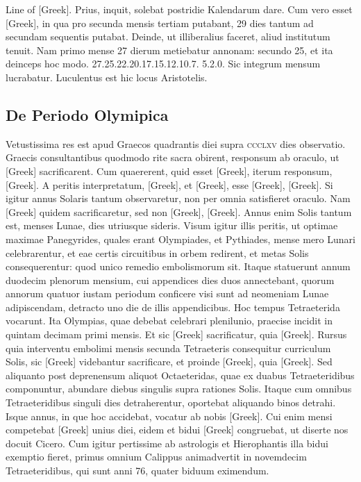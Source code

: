 \textgreek{Line of [Greek]}.
Prius, inquit, solebat postridie Kalendarum dare.
Cum vero esset
\textgreek{[Greek]}, in qua pro secunda mensis tertiam putabant,
 29 dies tantum
ad secundam sequentis putabat.
Deinde, ut illiberalius faceret, aliud
institutum tenuit.
Nam primo mense 27 dierum metiebatur annonam:
secundo 25, et ita deinceps hoc modo. 27.25.22.20.17.15.12.10.7.
5.2.0.
Sic integrum mensum lucrabatur.
Luculentus est hic locus
Aristotelis.

\subsection{De Periodo Olymipica}
Vetustissima res est apud Graecos quadrantis diei supra
\textsc{ccclxv} dies observatio.
Graecis consultantibus quodmodo
rite sacra obirent, responsum ab oraculo, ut \textgreek{[Greek]} sacrificarent.
Cum quaererent, quid esset \textgreek{[Greek]}, iterum responsum,
\textgreek{[Greek]}.
A peritis interpretatum, \textgreek{[Greek]}, et \textgreek{[Greek]},
esse \textgreek{[Greek]}, \textgreek{[Greek]}.
Si igitur annus Solaris tantum
observaretur, non per omnia satisfieret oraculo.
Nam \textgreek{[Greek]}
quidem sacrificaretur, sed non \textgreek{[Greek]}, \textgreek{[Greek]}.
Annus enim
Solis tantum est, menses Lunae, dies utriusque sideris.
Visum igitur
illis peritis, ut optimae maximae Panegyrides, quales erant Olympiades,
et Pythiades, mense mero Lunari celebrarentur, et eae certis circuitibus
in orbem redirent, et metas Solis consequerentur: quod unico
remedio embolismorum sit.
Itaque statuerunt annum duodecim plenorum
mensium, cui appendices dies duos annectebant, quorum annorum
quatuor iustam periodum conficere visi sunt ad neomeniam
Lunae adipiscendam, detracto uno die de illis appendicibus.
Hoc tempus
Tetraeterida vocarunt.
Ita Olympias, quae debebat celebrari plenilunio,
praecise incidit in quintam decimam primi mensis.
Et sic \textgreek{[Greek]}
sacrificatur, quia \textgreek{[Greek]}.
Rursus quia interventu embolimi mensis
secunda Tetraeteris consequitur curriculum Solis,
 sic \textgreek{[Greek]} videbantur
sacrificare, et proinde \textgreek{[Greek]}, quia \textgreek{[Greek]}.
Sed aliquanto post deprenensum aliquot Octaeteridas, quae ex
duabus Tetraeteridibus componuntur, abundare diebus singulis supra
rationes Solis.
Itaque cum omnibus Tetraeteridibus singuli dies detraherentur,
oportebat aliquando binos detrahi.
Isque annus, in que hoc
accidebat, vocatur ab nobis \textgreek{[Greek]}.
Cui enim mensi competebat
\textgreek{[Greek]} unius diei, eidem et bidui
 \textgreek{[Greek]} congruebat, ut diserte
nos docuit Cicero.
Cum igitur pertissime ab astrologis et Hierophantis
illa bidui exemptio fieret, primus omnium Calippus animadvertit
in novemdecim Tetraeteridibus, qui sunt anni 76, quater biduum eximendum.

